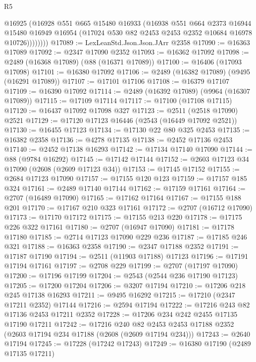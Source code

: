 \begin{lexlean}{R5}
\begin{coremodule}
              @16925
              (@16928
                @551
                @665
                @15480
                @16933
                (@16938
                  @551
                  @664
                  @2373
                  @16944
                  @15480
                  @16949
                  @16954
                  (@17024 @530 @82 @2453 @2453 @2352 @10684 @16978 @10726))))))))
@17089 := LexLeanStd.Json.Json.JArr @2358
@17090 := @16363 @17089
@17092 := @2347 @17090 @2352
@17093 := @16362 @17092
@17098 := @2489 (@16368 @17089) (@88 (@16371 @17089))
@17100 := @16406 (@17093 @17098)
@17101 := @16380 @17092
@17106 := @2489 (@16382 @17089) (@9495 (@16291 @17089))
@17107 := @17101 @17106
@17108 := @16379 @17107
@17109 := @16390 @17092
@17114 := @2489 (@16392 @17089) (@9964 (@16307 @17089))
@17115 := @17109 @17114
@17117 := @17100 (@17108 @17115)
@17120 := @16437 @17092 @17098 @327
@17123 := @2511 (@2518 @17090) @2521
@17129 := @17120 @17123 @16446 (@2543 (@16449 @17092 @2521))
@17130 := @16455 @17123
@17134 := @17130 @22 @80 @325 @2453
@17135 := @16382 @2358
@17136 := @4278 @17135
@17138 := @2452 @17136 @2453
@17140 := @2452 @17138 @16293
@17142 := @17134 @17140 @17090
@17144 := @88 (@9784 @16292)
@17145 := @17142 @17144
@17152 := @2603 @17123 @34 @17090 (@2608 (@2609 @17123 @34))
@17153 := @17145 @17152
@17155 := @2684 @17123 @17090
@17157 := @17155 @120 @123
@17159 := @17157 @185 @324
@17161 := @2489 @17140 @17144
@17162 := @17159 @17161
@17164 := @2707 (@16489 @17090)
@17165 := @17162 @17164
@17167 := @17155 @188 @201
@17170 := @17167 @210 @323 @17161
@17172 := @2707 (@16712 @17090)
@17173 := @17170 @17172
@17175 := @17155 @213 @220
@17178 := @17175 @226 @322 @17161
@17180 := @2707 (@16947 @17090)
@17181 := @17178 @17180
@17185 := @2714 @17123 @17090 @229 @236
@17187 := @17185 @246 @321
@17188 := @16363 @2358
@17190 := @2347 @17188 @2352
@17191 := @17187 @17190
@17194 := @2511 (@11903 @17188) @17123
@17196 := @17191 @17194 @17161
@17197 := @2708 @229
@17199 := @2707 (@17197 @17090)
@17200 := @17196 @17199
@17204 := @2543 (@2544 @236 @17190 @17123)
@17205 := @17200 @17204
@17206 := @3207 @17194
@17210 := @17206 @218 @245 @17138 @16293
@17211 := @9495 @16292
@17215 := @17210 (@2347 @17211 @2352) @17144
@17216 := @2594 @17194
@17222 := @17216 @243 @82 @17136 @2453 @17211 @2352
@17228 := @17206 @234 @242 @2455 @17135 @17190 @17211
@17242 := @17216
    @240
    @82
    @2453
    @2453
    @17188
    @2352
    (@2603 @17194 @234 @17188 (@2608 (@2609 @17194 @234)))
@17243 := @2640 @17194
@17245 := @17228 (@17242 @17243)
@17249 := @16380 @17190 (@2489 @17135 @17211)

\end{coremodule}
\end{lexlean}

